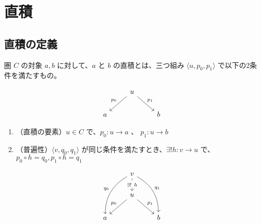 \documentclass[uplatex,a4j,12pt,dvipdfmx]{jsarticle}
\begin{document}
\section{直積}

\subsection{直積の定義}

圏 $C$ の対象 $a,b$ に対して、$a$ と $b$ の直積とは、三つ組み $\langle u,p_{0},p_{1} \rangle$ で以下の2条件を満たすもの。

\[
\begin{tikzcd}
  & u \arrow[ld, "p_{0}"'] \arrow[rd, "p_{1}"] &   \\
a &                                            & b
\end{tikzcd}
\]

\begin{enumerate}
    \item （直積の要素）$u \in C$ で、$p_{0} : u \to a$ 、 $p_{1} : u \to b$
    \item （普遍性）$\langle v,q_{0},q_{1} \rangle$ が同じ条件を満たすとき、$\exists ! h: v \to u$ で、
    $p_{0} \circ h = q_{0}, p_{1} \circ h = q_{1}$
\end{enumerate}

\[
\begin{tikzcd}
  & v \arrow[ldd, "q_{0}"', bend right] \arrow[rdd, "q_{1}", bend left] \arrow[d, "\exists ! \ h" description, dashed] &   \\
  & u \arrow[ld, "p_{0}"'] \arrow[rd, "p_{1}"]                                                                         &   \\
a &                                                                                                                    & b
\end{tikzcd}
\]
\end{document}
